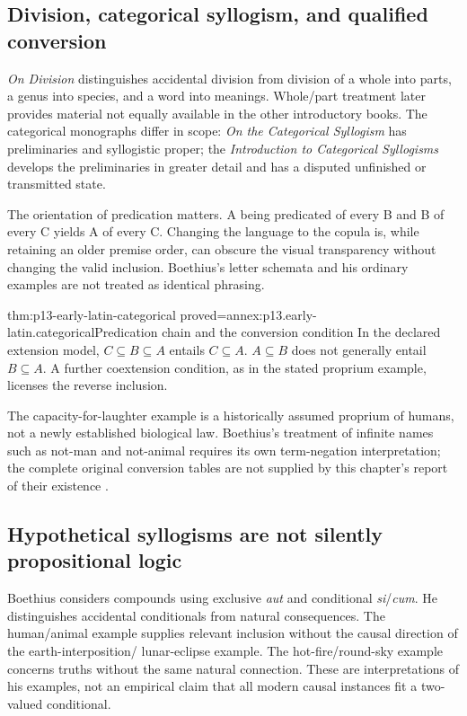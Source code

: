 \subsection{Division, categorical syllogism, and qualified conversion}

\emph{On Division} distinguishes accidental division from division
of a whole into parts, a genus into species, and a word into meanings.
Whole/part treatment later provides material not equally available
in the other introductory books. The categorical monographs differ
in scope: \emph{On the Categorical Syllogism} has preliminaries and
syllogistic proper; the \emph{Introduction to Categorical Syllogisms}
develops the preliminaries in greater detail and has a disputed
unfinished or transmitted state.

The orientation of predication matters. A being predicated of every
B and B of every C yields A of every C. Changing the language to
the copula is, while retaining an older premise order, can obscure
the visual transparency without changing the valid inclusion.
Boethius's letter schemata and his ordinary examples are not treated
as identical phrasing.

\begin{hblemma}{thm:p13-early-latin-categorical}
 {proved=annex:p13.early-latin.categorical}{Predication chain and the conversion condition}
In the declared extension model, \(C\subseteq B\subseteq A\)
entails \(C\subseteq A\). \(A\subseteq B\) does not generally entail
\(B\subseteq A\). A further coextension condition, as in the
stated proprium example, licenses the reverse inclusion.
\end{hblemma}

The capacity-for-laughter example is a historically assumed proprium
of humans, not a newly established biological law. Boethius's treatment
of infinite names such as not-man and not-animal requires its own
term-negation interpretation; the complete original conversion tables
are not supplied by this chapter's report of their existence
\cite[pp.~14--15]{Marenbon2007FordhamEarlyLatin}.

\subsection{Hypothetical syllogisms are not silently propositional logic}

Boethius considers compounds using exclusive \emph{aut} and conditional
\emph{si}/\emph{cum}. He distinguishes accidental conditionals from
natural consequences. The human/animal example supplies relevant
inclusion without the causal direction of the earth-interposition/
lunar-eclipse example. The hot-fire/round-sky example concerns truths
without the same natural connection.
These are interpretations of his examples, not an empirical claim
that all modern causal instances fit a two-valued conditional.

